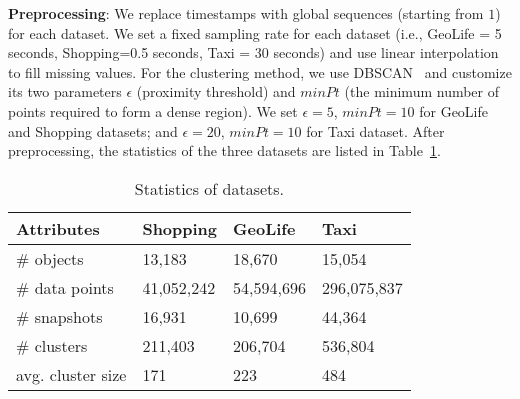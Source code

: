 \textbf{Preprocessing}: We replace timestamps with global sequences (starting from $1$) for each dataset. 
We set a fixed sampling rate for each dataset (i.e., GeoLife = 5 seconds, Shopping=0.5 seconds, Taxi = 30 seconds)
and use linear interpolation to fill missing values.
For the clustering method, we use DBSCAN~\cite{ester1996density} and customize its two parameters $\epsilon$ (proximity threshold) and $minPt$ (the minimum number of points required to form a dense region). We set $\epsilon=5$, $minPt=10$ for GeoLife and Shopping datasets; and $\epsilon=20$, $minPt=10$ for Taxi dataset. 
After preprocessing, the statistics of the three datasets are listed in Table~\ref{exp:dataset}. 

\begin{table} [t]
\centering
\caption{Statistics of datasets.}
\label{exp:dataset}
\begin{tabular}{|l|l|l|l|}
\hline
 \textbf{Attributes}& \textbf{Shopping} &  \textbf{GeoLife} &  \textbf{Taxi} \\ 
\hline 
\# objects  & 13,183 & 18,670 & 15,054\\ 
\hline
\# data points  & 41,052,242 & 54,594,696 & 296,075,837\\ 
\hline
\# snapshots  & 16,931 & 10,699 & 44,364\\ 
\hline
\# clusters  & 211,403  & 206,704& 536,804\\
\hline
avg. cluster size  & 171 & 223 & 484\\
\hline
\end{tabular}
\end{table}


